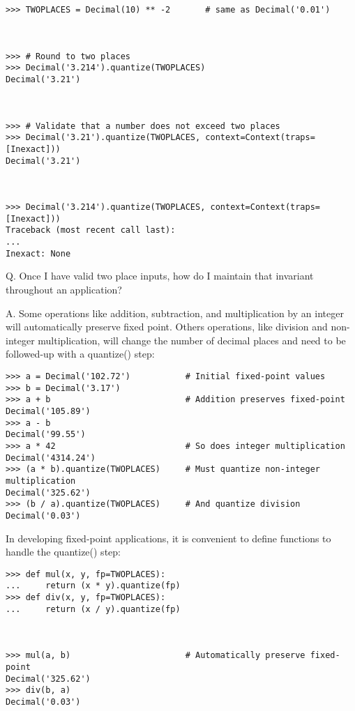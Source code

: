 \begin{lstlisting}
>>> TWOPLACES = Decimal(10) ** -2       # same as Decimal('0.01')



>>> # Round to two places
>>> Decimal('3.214').quantize(TWOPLACES)
Decimal('3.21')



>>> # Validate that a number does not exceed two places
>>> Decimal('3.21').quantize(TWOPLACES, context=Context(traps=[Inexact]))
Decimal('3.21')



>>> Decimal('3.214').quantize(TWOPLACES, context=Context(traps=[Inexact]))
Traceback (most recent call last):
...
Inexact: None
\end{lstlisting}

Q. Once I have valid two place inputs, how do I maintain that invariant throughout an application?

A. Some operations like addition, subtraction, and multiplication by an integer will automatically preserve fixed point. Others operations, like division and non-integer multiplication, will change the number of decimal places and need to be followed-up with a quantize() step:

\begin{lstlisting}
>>> a = Decimal('102.72')           # Initial fixed-point values
>>> b = Decimal('3.17')
>>> a + b                           # Addition preserves fixed-point
Decimal('105.89')
>>> a - b
Decimal('99.55')
>>> a * 42                          # So does integer multiplication
Decimal('4314.24')
>>> (a * b).quantize(TWOPLACES)     # Must quantize non-integer multiplication
Decimal('325.62')
>>> (b / a).quantize(TWOPLACES)     # And quantize division
Decimal('0.03')
\end{lstlisting}

In developing fixed-point applications, it is convenient to define functions to handle the quantize() step:

\begin{lstlisting}
>>> def mul(x, y, fp=TWOPLACES):
...     return (x * y).quantize(fp)
>>> def div(x, y, fp=TWOPLACES):
...     return (x / y).quantize(fp)



>>> mul(a, b)                       # Automatically preserve fixed-point
Decimal('325.62')
>>> div(b, a)
Decimal('0.03')
\end{lstlisting}

